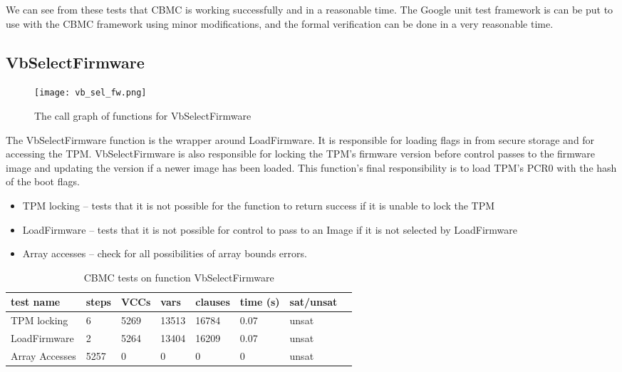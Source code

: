 We can see from these tests that CBMC is working successfully and in a reasonable time.
The Google unit test framework is can be put to use with the CBMC framework using minor modifications, and the formal verification can be done in a very reasonable time.

\subsection{VbSelectFirmware}

\begin{figure}[!htbp]
  \centering
  \texttt{[image: vb\_sel\_fw.png]}
  \caption[VbSelectFirmware Call Graph]{The call graph of functions for VbSelectFirmware}\label{fig:vbselfw}
\end{figure}

The VbSelectFirmware function is the wrapper around LoadFirmware.
It is responsible for loading flags in from secure storage and for accessing the TPM\@.
VbSelectFirmware is also responsible for locking the TPM's firmware version before control passes to the firmware image and updating the version if a newer image has been loaded.
This function's final responsibility is to load TPM's PCR0 with the hash of the boot flags.

\begin{itemize}
 \item  TPM locking -- tests that it is not possible for the function to return success if it is unable to lock the TPM
 \item  LoadFirmware -- tests that it is not possible for control to pass to an Image if it is not selected by LoadFirmware
 \item  Array accesses -- check for all possibilities of array bounds errors.
\end{itemize}

\begin{table}[]
    \centering
    \caption{CBMC tests on function VbSelectFirmware}\label{sfw_results}
    \begin{tabular}{|l|l|l|l|l|l|l|l|}
        \hline
        test name & steps & VCCs & vars  & clauses & time (s) & sat/unsat  \\ \hline \hline
        TPM locking & 6 & 5269 & 13513 & 16784 & 0.07 & unsat \\ \hline
        LoadFirmware & 2 & 5264 & 13404 & 16209 & 0.07 & unsat \\ \hline
        Array Accesses & 5257 & 0 & 0 & 0 & 0 &  unsat \\ \hline
    \end{tabular}
\end{table}

